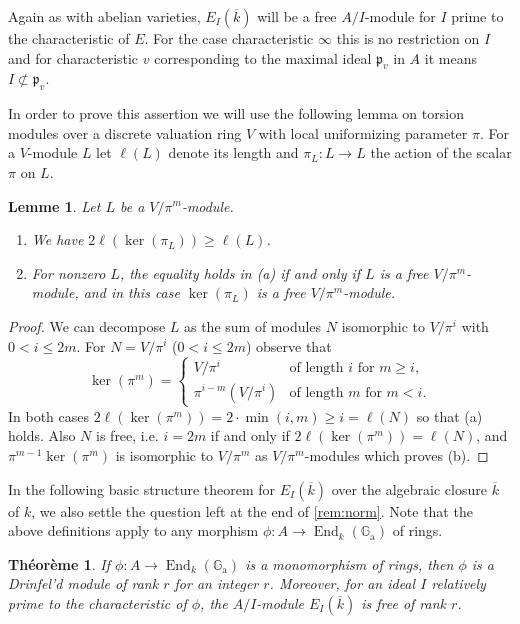 \documentclass[12pt,a4paper]{article}
\theoremstyle{plain}
\newtheorem{theorem}{Th\'eor\`eme}[section]
\newtheorem{lemma}{Lemme}[section]
\theoremstyle{definition}
\theoremstyle{remark}
\DeclareMathOperator{\End}{End}
\newcommand{\fp}{\mathfrak{p}}
\newcommand{\Ga}{\mathbb{G}_\mathrm{a}}
\providecommand{\Ga}{\mathbb{G}_{\mathrm a}}
\providecommand{\End}{\operatorname{End}}
\providecommand{\fp}{\mathfrak{p}}
\begin{document}
Again as with abelian varieties, $E_I(\overline{k})$ will be a free $A/I$-module for $I$ prime to the characteristic of $E$. For the case characteristic $\infty$ this is no restriction on $I$ and for characteristic $v$ corresponding to the maximal ideal $\fp_v$ in $A$ it means $I \not\subset \fp_v$.

In order to prove this assertion we will use the following lemma on torsion modules over a discrete valuation ring $V$ with local uniformizing parameter $\pi$. For a $V$-module $L$ let $\ell(L)$ denote its length and $\pi_L: L \to L$ the action of the scalar $\pi$ on $L$.

\begin{lemma}
\label{lem:torsion}
Let $L$ be a $V/\pi^m$-module.
\begin{enumerate}[label=(\alph*)]
\item We have $2\ell(\ker(\pi_L)) \geq \ell(L)$.
\item For nonzero $L$, the equality holds in \textup{(a)} if and only if $L$ is a free $V/\pi^m$-module, and in this case $\ker(\pi_L)$ is a free $V/\pi^m$-module.
\end{enumerate}
\end{lemma}

\begin{proof}
We can decompose $L$ as the sum of modules $N$ isomorphic to $V/\pi^i$ with $0 < i \leq 2m$. For $N = V/\pi^i$ ($0 < i \leq 2m$) observe that
\[
\ker(\pi^m) = \begin{cases} V/\pi^i & \text{of length } i \text{ for } m \geq i, \\ \pi^{i-m}(V/\pi^i) & \text{of length } m \text{ for } m < i. \end{cases}
\]
In both cases $2\ell(\ker(\pi^m)) = 2 \cdot \min(i, m) \geq i = \ell(N)$ so that (a) holds. Also $N$ is free, i.e. $i = 2m$ if and only if $2\ell(\ker(\pi^m)) = \ell(N)$, and $\pi^{m-1}\ker(\pi^m)$ is isomorphic to $V/\pi^m$ as $V/\pi^m$-modules which proves (b).
\end{proof}

In the following basic structure theorem for $E_I(\overline{k})$ over the algebraic closure $\overline{k}$ of $k$, we also settle the question left at the end of \eqref{rem:norm}. Note that the above definitions apply to any morphism $\phi: A \to \End_k(\Ga)$ of rings.

\begin{theorem}
\label{thm:structure}
If $\phi: A \to \End_k(\Ga)$ is a monomorphism of rings, then $\phi$ is a Drinfel'd module of rank $r$ for an integer $r$. Moreover, for an ideal $I$ relatively prime to the characteristic of $\phi$, the $A/I$-module $E_I(\overline{k})$ is free of rank $r$.
\end{theorem}
\end{document}
